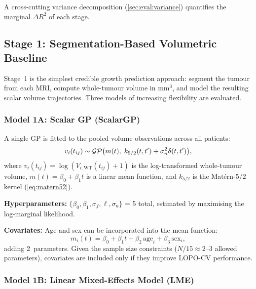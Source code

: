 A cross-cutting variance decomposition (\cref{sec:eval:variance}) quantifies
the marginal $\Delta R^2$ of each stage.

\subsection{Stage 1: Segmentation-Based Volumetric Baseline}
\label{sec:growth:stage1}

Stage~1 is the simplest credible growth prediction approach: segment the
tumour from each MRI, compute whole-tumour volume in mm$^3$, and model the
resulting scalar volume trajectories. Three models of increasing flexibility
are evaluated.

\subsubsection{Model 1A: Scalar GP (ScalarGP)}

A single GP is fitted to the pooled volume observations across all patients:
\begin{equation}
  v_i(t_{ij}) \sim \mathcal{GP}\bigl(m(t),\; k_{5/2}(t, t') + \sigma_n^2 \delta(t, t')\bigr),
  \label{eq:scalargp}
\end{equation}
where $v_i(t_{ij}) = \log(V_{i,\text{WT}}(t_{ij}) + 1)$ is the
log-transformed whole-tumour volume, $m(t) = \beta_0 + \beta_1 t$ is a
linear mean function, and $k_{5/2}$ is the Mat\'{e}rn-5/2 kernel
(\cref{eq:matern52}).

\textbf{Hyperparameters:} $\{\beta_0, \beta_1, \sigma_f, \ell, \sigma_n\}$
= 5 total, estimated by maximising the log-marginal likelihood.

\textbf{Covariates:} Age and sex can be incorporated into the mean function:
\begin{equation}
  m_i(t) = \beta_0 + \beta_1 t + \beta_2 \,\text{age}_i
    + \beta_3 \,\text{sex}_i,
  \label{eq:scalargp_covariates}
\end{equation}
adding 2~parameters. Given the sample size constraints ($N/15 \approx 2$--$3$
allowed parameters), covariates are included only if they improve LOPO-CV
performance.

\subsubsection{Model 1B: Linear Mixed-Effects Model (LME)}

